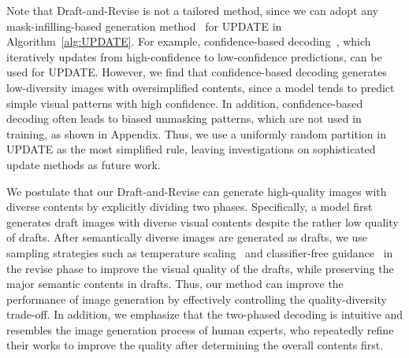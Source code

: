 \documentclass{article}
\begin{document}
Note that Draft-and-Revise is not a tailored method, since we can adopt any mask-infilling-based generation method~\cite{UnleashingTransformer,MaskGIT} for \textsc{UPDATE} in Algorithm~\ref{alg:UPDATE}.
For example, confidence-based decoding~\cite{MaskGIT,ShowMeWhat}, which iteratively updates  from high-confidence to low-confidence predictions, can be used for \textsc{UPDATE}.
However, we find that confidence-based decoding generates low-diversity images with oversimplified contents, since a model tends to predict simple visual patterns with high confidence.
In addition, confidence-based decoding often leads to biased unmasking patterns, which are not used in training, as shown in Appendix.
Thus, we use a uniformly random partition  in \textsc{UPDATE} as the most simplified rule, leaving investigations on sophisticated update methods as future work.




We postulate that our Draft-and-Revise can generate high-quality images with diverse contents by explicitly dividing two phases.
Specifically, a model first generates draft images with diverse visual contents despite the rather low quality of drafts.
After semantically diverse images are generated as drafts, we use sampling strategies such as temperature scaling~\cite{hinton2015distilling} and classifier-free guidance~\cite{ho2021classifierfree} in the revise phase to improve the visual quality of the drafts, while preserving the major semantic contents in drafts.
Thus, our method can improve the performance of image generation by effectively controlling the quality-diversity trade-off.
In addition, we emphasize that the two-phased decoding is intuitive and resembles the image generation process of human experts, who repeatedly refine their works to improve the quality after determining the overall contents first.
\end{document}
